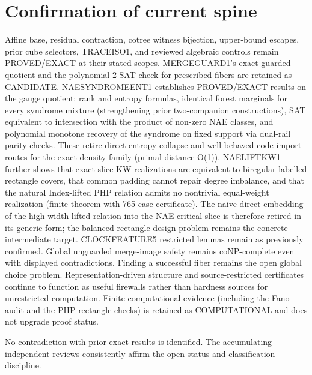 \documentclass[11pt]{article}
\begin{document}
\section{Confirmation of current spine}
Affine base, residual contraction, cotree witness bijection, upper-bound escapes, prior cube selectors, TRACEISO1, and reviewed algebraic controls remain PROVED/EXACT at their stated scopes. MERGEGUARD1's exact guarded quotient and the polynomial 2-SAT check for prescribed fibers are retained as CANDIDATE. NAESYNDROMEENT1 establishes PROVED/EXACT results on the gauge quotient: rank and entropy formulas, identical forest marginals for every syndrome mixture (strengthening prior two-companion constructions), SAT equivalent to intersection with the product of non-zero NAE classes, and polynomial monotone recovery of the syndrome on fixed support via dual-rail parity checks. These retire direct entropy-collapse and well-behaved-code import routes for the exact-density family (primal distance O(1)). NAELIFTKW1 further shows that exact-slice KW realizations are equivalent to biregular labelled rectangle covers, that common padding cannot repair degree imbalance, and that the natural Index-lifted PHP relation admits no nontrivial equal-weight realization (finite theorem with 765-case certificate). The naive direct embedding of the high-width lifted relation into the NAE critical slice is therefore retired in its generic form; the balanced-rectangle design problem remains the concrete intermediate target. CLOCKFEATURE5 restricted lemmas remain as previously confirmed. Global unguarded merge-image safety remains coNP-complete even with displayed contradictions. Finding a successful fiber remains the open global choice problem. Representation-driven structure and source-restricted certificates continue to function as useful firewalls rather than hardness sources for unrestricted computation. Finite computational evidence (including the Fano audit and the PHP rectangle checks) is retained as COMPUTATIONAL and does not upgrade proof status.

No contradiction with prior exact results is identified. The accumulating independent reviews consistently affirm the open status and classification discipline.
\end{document}
